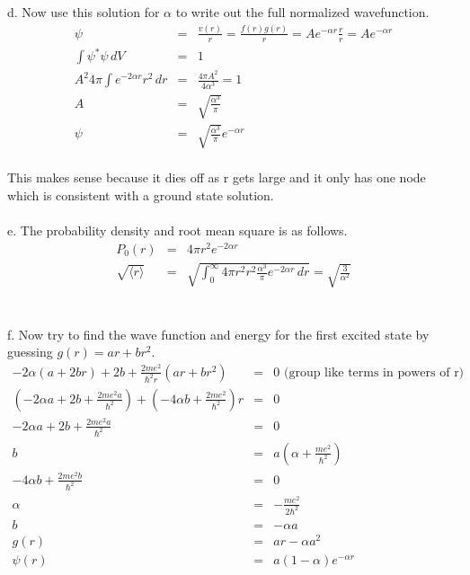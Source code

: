 \documentclass[11pt]{amsart}
\begin{document}
d. Now use this solution for $\alpha$ to write out the full normalized wavefunction. \\
\begin{eqnarray*} 
\psi &=& \frac{v(r)}{r} = \frac{f(r)g(r)}{r} = Ae^{-\alpha{r}}\frac{r}{r} = Ae^{-\alpha{r}} \\
\int\psi^{*}\psi\,dV &=& 1 \\
A^{2}4\pi\int{e^{-2\alpha{r}}r^{2}}\,dr &=& \frac{4\pi{}A^{2}}{4\alpha^{3}} = 1 \\
A  &=& \sqrt{\frac{\alpha^{3}}{\pi}} \\
\psi &=& \sqrt{\frac{\alpha^{3}}{\pi}}e^{-\alpha{r}} 
\end{eqnarray*} \\
This makes sense because it dies off as r gets large and it only has one node which is consistent with a ground state solution. \\ \\
e. The probability density and root mean square is as follows. \\
\begin{eqnarray*} 
P_{0}(r) &=& 4\pi{r^{2}}e^{-2\alpha{r}} \\
\sqrt{\langle{r}\rangle} &=& \sqrt{\int_{0}^{\infty}4\pi{r^{2}}r^{2}\frac{\alpha^{3}}{\pi}e^{-2\alpha{r}}\,dr} =
\sqrt{\frac{3}{\alpha^{2}}}
\end{eqnarray*} \\ \\
f. Now try to find the wave function and energy for the first excited state by guessing $ g(r)=ar+br^{2} $. \\
\begin{eqnarray*}
-2\alpha{}(a+2br)+2b+\frac{2me^{2}}{\hbar^{2}r}(ar+br^{2}) &=& 0\mbox{     (group like terms in powers of r)} \\
(-2\alpha{a}+2b+\frac{2me^{2}a}{\hbar^{2}})+(-4\alpha{b}+\frac{2me^{2}}{\hbar^{2}})r &=& 0 \\
-2\alpha{a}+2b+ \frac{2me^{2}a}{\hbar^{2}} &=& 0 \\
b &=& a(\alpha+\frac{me^{2}}{\hbar^{2}}) \\
-4\alpha{b}+\frac{2me^{2}b}{\hbar^{2}} &=& 0 \\
\alpha &=& -\frac{me^{2}}{2\hbar^{2}} \\
b &=& -\alpha{a} \\
g(r) &=& ar-\alpha{a}^{2} \\
\psi(r) &=& a(1-\alpha)e^{-\alpha{r}} 
\end{eqnarray*} \\
\end{document}
